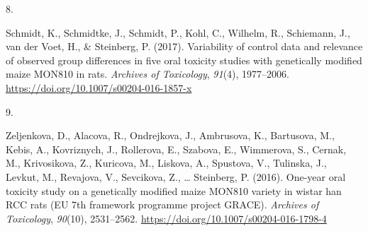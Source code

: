 \documentclass[11pt, a4paper]{awesome-cv}
\newlength{\csllabelwidth}
\newcommand{\CSLLeftMargin}[1]{\parbox[t]{\csllabelwidth}{#1}}
\newcommand{\CSLRightInline}[1]{\parbox[t]{\linewidth - \csllabelwidth}{#1}}
\begin{document}
\leavevmode\hypertarget{ref-Schmidt2017}{}%
\CSLLeftMargin{8. }
\CSLRightInline{Schmidt, K., Schmidtke, J., Schmidt, P., Kohl, C.,
Wilhelm, R., Schiemann, J., van der Voet, H., \& Steinberg, P. (2017).
Variability of control data and relevance of observed group differences
in five oral toxicity studies with genetically modified maize MON810 in
rats. \emph{Archives of Toxicology}, \emph{91}(4), 1977--2006.
\url{https://doi.org/10.1007/s00204-016-1857-x}}

\leavevmode\hypertarget{ref-Zeljenkova2016}{}%
\CSLLeftMargin{9. }
\CSLRightInline{Zeljenkova, D., Alacova, R., Ondrejkova, J., Ambrusova,
K., Bartusova, M., Kebis, A., Kovriznych, J., Rollerova, E., Szabova,
E., Wimmerova, S., Cernak, M., Krivosikova, Z., Kuricova, M., Liskova,
A., Spustova, V., Tulinska, J., Levkut, M., Revajova, V., Sevcikova, Z.,
\ldots{} Steinberg, P. (2016). One-year oral toxicity study on a
genetically modified maize MON810 variety in wistar han RCC rats (EU 7th
framework programme project GRACE). \emph{Archives of Toxicology},
\emph{90}(10), 2531--2562.
\url{https://doi.org/10.1007/s00204-016-1798-4}}
\end{document}
